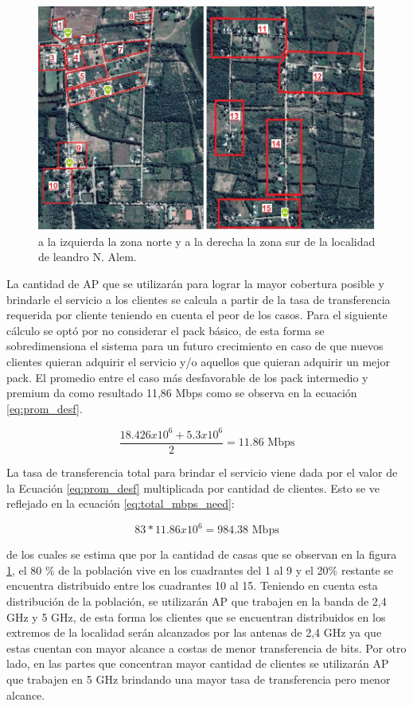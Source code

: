 \documentclass[11pt,a4paper]{article}
\begin{document}
\begin{figure}[htbp]
  \centering
  \includegraphics[width=\linewidth]{fotos_ema/cuadrantes_alem.jpg}
  \caption{a la izquierda la zona norte y a la derecha la zona sur de la localidad de leandro N. Alem.}
  \label{fig:cuadrantes_alem}
\end{figure}

La cantidad de AP que se utilizarán para lograr la mayor cobertura posible y brindarle el servicio a los clientes se calcula a partir de la tasa de transferencia requerida por cliente teniendo en cuenta el peor de los casos.
Para el siguiente cálculo se optó por no considerar el pack básico, de esta forma se sobredimensiona el sistema para un futuro crecimiento en caso de que nuevos clientes quieran adquirir el servicio y/o aquellos que quieran adquirir un mejor pack. 
El promedio entre el caso más desfavorable de los pack intermedio y premium da como resultado 11,86 Mbps como se observa en la ecuación \ref{eq:prom_desf}. 

\begin{equation}
  \frac{18.426x{10}^6+5.3x{10}^6}{2}=11.86 \text{ Mbps}
  \label{eq:prom_desf}
\end{equation}

La tasa de transferencia total para brindar el servicio viene dada por el valor de la Ecuación \ref{eq:prom_desf} multiplicada por cantidad de clientes. Esto se ve reflejado en la ecuación \ref{eq:total_mbps_need}:

\begin{equation}
  83 * 11.86x{10}^6 = 984.38 \text{ Mbps}
  \label{eq:total_mbps_need}
\end{equation}

de los cuales se estima que por la cantidad de casas que se observan en la figura \ref{fig:cuadrantes_alem}, el 80 \% de la población vive en los cuadrantes del 1 al 9 y el 20\% restante se encuentra distribuido entre los cuadrantes 10 al 15. 
Teniendo en cuenta esta distribución de la población, se utilizarán AP que trabajen en la banda de 2,4 GHz y 5 GHz, de esta forma los clientes que se encuentran distribuidos en los extremos de la localidad serán alcanzados por las antenas de 2,4 GHz ya que estas cuentan con mayor alcance a costas de menor transferencia de bits. 
Por otro lado, en las partes que concentran mayor cantidad de clientes se utilizarán AP que trabajen en 5 GHz brindando una mayor tasa de transferencia pero menor alcance.
\end{document}
